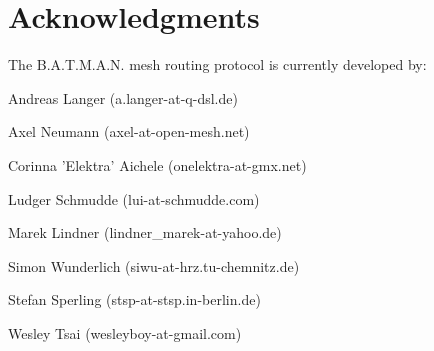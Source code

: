 \documentclass[11pt]{article}
\begin{document}
\label{sec:howto-client}



\section {Acknowledgments}
\label{sec:acks}

The B.A.T.M.A.N. mesh routing protocol is currently developed by:

Andreas Langer (a.langer-at-q-dsl.de)

Axel Neumann (axel-at-open-mesh.net)

Corinna 'Elektra' Aichele (onelektra-at-gmx.net)

Ludger Schmudde (lui-at-schmudde.com)

Marek Lindner (lindner\_marek-at-yahoo.de)

Simon Wunderlich (siwu-at-hrz.tu-chemnitz.de)

Stefan Sperling (stsp-at-stsp.in-berlin.de)

Wesley Tsai (wesleyboy-at-gmail.com)









%
\end{document}
